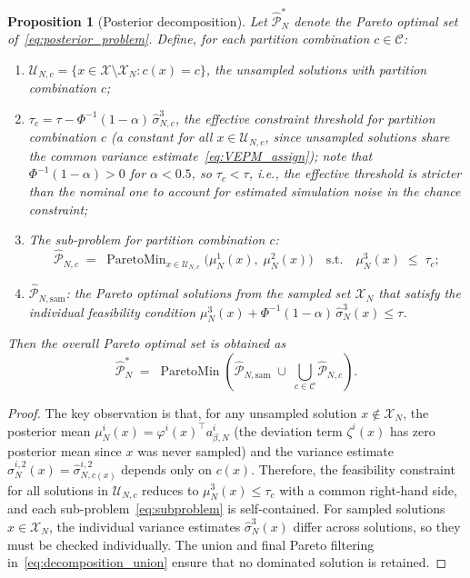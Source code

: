 \documentclass[12pt]{article}
\theoremstyle{plain}
\newtheorem{proposition}{Proposition}[section]
\theoremstyle{definition}
\theoremstyle{remark}
\begin{document}
\begin{proposition}[Posterior decomposition]\label{prop:decomposition}
Let $\hat{\mathcal{P}}_N^*$ denote the Pareto optimal set of~\eqref{eq:posterior_problem}. Define, for each partition combination $c \in \mathcal{C}$:
\begin{enumerate}[label=(\roman*)]
  \item $\mathcal{U}_{N,c} = \{x \in \mathcal{X} \setminus \mathcal{X}_N : c(x) = c\}$, the unsampled solutions with partition combination $c$;
  \item $\tau_c = \tau - \Phi^{-1}(1-\alpha)\, \hat{\sigma}^{3}_{N,c}$, the effective constraint threshold for partition combination $c$ (a constant for all $x \in \mathcal{U}_{N,c}$, since unsampled solutions share the common variance estimate~\eqref{eq:VEPM_assign}); note that $\Phi^{-1}(1-\alpha) > 0$ for $\alpha < 0.5$, so $\tau_c < \tau$, i.e., the effective threshold is stricter than the nominal one to account for estimated simulation noise in the chance constraint;
  \item The sub-problem for partition combination $c$:
  \begin{equation}\label{eq:subproblem}
    \hat{\mathcal{P}}_{N,c} \;=\; \operatorname{ParetoMin}_{x \in \mathcal{U}_{N,c}} \bigl(\mu^1_N(x),\; \mu^2_N(x)\bigr) \quad \text{s.t.}\quad \mu^3_N(x) \;\leq\; \tau_c;
  \end{equation}
  \item $\hat{\mathcal{P}}_{N,\mathrm{sam}}$: the Pareto optimal solutions from the sampled set $\mathcal{X}_N$ that satisfy the individual feasibility condition $\mu^3_N(x) + \Phi^{-1}(1-\alpha)\, \hat{\sigma}^3_N(x) \leq \tau$.
\end{enumerate}
Then the overall Pareto optimal set is obtained as
\begin{equation}\label{eq:decomposition_union}
  \hat{\mathcal{P}}_N^* \;=\; \operatorname{ParetoMin}\!\left(\hat{\mathcal{P}}_{N,\mathrm{sam}} \;\cup\; \bigcup_{c \in \mathcal{C}} \hat{\mathcal{P}}_{N,c}\right).
\end{equation}
\end{proposition}

\begin{proof}
The key observation is that, for any unsampled solution $x \notin \mathcal{X}_N$, the posterior mean $\mu^i_N(x) = \varphi^i(x)^\top a^i_{\beta,N}$ (the deviation term $\zeta^i(x)$ has zero posterior mean since $x$ was never sampled) and the variance estimate $\hat{\sigma}^{i,2}_N(x) = \hat{\sigma}^{i,2}_{N,c(x)}$ depends only on $c(x)$. Therefore, the feasibility constraint for all solutions in $\mathcal{U}_{N,c}$ reduces to $\mu^3_N(x) \leq \tau_c$ with a common right-hand side, and each sub-problem~\eqref{eq:subproblem} is self-contained. For sampled solutions $x \in \mathcal{X}_N$, the individual variance estimates $\hat{\sigma}^3_N(x)$ differ across solutions, so they must be checked individually. The union and final Pareto filtering in~\eqref{eq:decomposition_union} ensure that no dominated solution is retained.
\end{proof}
\end{document}
